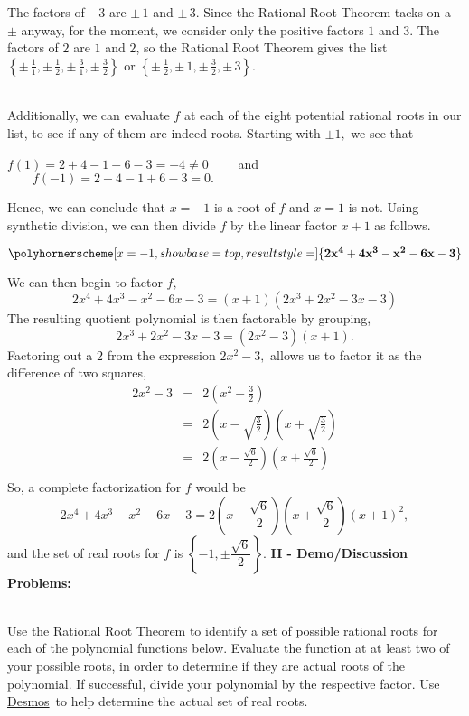 \documentclass[12pt]{article}
\theoremstyle{definition}
\newcommand{\Desmos}{\href{https://www.desmos.com/}{Desmos}}
\begin{document}
The factors of $-3$ are $\pm \, 1$ and $\pm \, 3$.  Since the Rational Root Theorem tacks on a $\pm$ anyway, for the moment, we consider only the positive factors $1$ and $3$.  The factors of $2$ are  $1$ and $2$, so the Rational Root Theorem gives the list $\left\{\pm \, \frac{1}{1}, \pm \, \frac{1}{2},  \pm \, \frac{3}{1}, \pm \, \frac{3}{2}\right\}$ or $\left\{\pm \, \frac{1}{2}, \pm \, 1, \pm \, \frac{3}{2}, \pm \, 3\right\}$.\\
\ \par
Additionally, we can evaluate $f$ at each of the eight potential rational roots in our list, to see if any of them are indeed roots.  Starting with $\pm 1,$ we see that 
\begin{center}
$f(1)=2+4-1-6-3=-4\neq 0\qquad$ and $\qquad f(-1)=2-4-1+6-3=0.$
\end{center}
\begin{multicols}{2}
Hence, we can conclude that $x=-1$ is a root of $f$ and $x=1$ is not.  Using synthetic division, we can then divide $f$ by the linear factor $x+1$ as follows.
\columnbreak
\begin{center}
$\polyhornerscheme[x=-1,showbase=top,resultstyle=\bf]{2x^4+4x^3-x^2-6x-3}$
\end{center}
\end{multicols}
We can then begin to factor $f,$
$$2x^4+4x^3-x^2-6x-3=(x+1)(2x^3+2x^2-3x-3)$$
The resulting quotient polynomial is then factorable by grouping,
$$2x^3+2x^2-3x-3=(2x^2-3)(x+1).$$
Factoring out a $2$ from the expression $2x^2-3,$ allows us to factor it as the difference of two squares,
\begin{eqnarray*}
2x^2-3 & = & 2\left(x^2-\frac{3}{2}\right)\\
& = & 2\left(x-\sqrt{\frac{3}{2}}\right)\left(x+\sqrt{\frac{3}{2}}\right)\\
& = & 2\left(x-\frac{\sqrt{6}}{2}\right)\left(x+\frac{\sqrt{6}}{2}\right)\\
\end{eqnarray*}
So, a complete factorization for $f$ would be
$$2x^4+4x^3-x^2-6x-3=2\left(x-\frac{\sqrt{6}}{2}\right)\left(x+\frac{\sqrt{6}}{2}\right)\left(x+1\right)^2,$$
and the set of real roots for $f$ is $\left\{-1,\pm\dfrac{\sqrt{6}}{2}\right\}$.
\newpage
{\bf II - Demo/Discussion Problems:}\\
\ \par
Use the Rational Root Theorem to identify a set of possible rational roots for each of the polynomial functions below.  Evaluate the function at at least two of your possible roots, in order to determine if they are actual roots of the polynomial.  If successful, divide your polynomial by the respective factor.  Use \Desmos \ to help determine the actual set of real roots.
\end{document}
